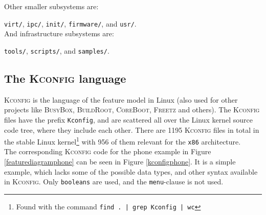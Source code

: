 \documentclass[a4paper,11pt]{report}
\newcommand{\f}{\footnote{\fn}}
\newcommand{\textcode}[1]{\fboxsep=1pt\texttt{\colorbox{gray!20}{#1}}}
\newcommand{\figa}{
    \begin{figure}[!htpb]
    \centering
}
\newcommand{\figb}[2]{
    \caption{#1}
    \label{#2}
    \end{figure}
}
\begin{document}
Other smaller subsystems are:

\texttt{virt/}, \texttt{ipc/}, \texttt{init/}, \texttt{firmware/}, and \texttt{usr/}.
\\

And infrastructure subsystems are:

\texttt{tools/}, \texttt{scripts/}, and \texttt{samples/}.

            \subsection{The \textsc{Kconfig} language} 

            \def \fn{Found with the command \textcode{find .\ | grep Kconfig | wc}}

\textsc{Kconfig} is the language of the feature model in Linux (also used for 
other projects like \textsc{BusyBox}, \textsc{BuildRoot}, \textsc{CoreBoot}, 
\textsc{Freetz} and others)\cite[p. 4]{VarModSSD}.  The \textsc{Kconfig} files have the prefix \textcode{Kconfig}, and are 
scattered all over the Linux kernel source code tree, where they include each 
other. There are 1195 \textsc{Kconfig} files in total in the stable Linux kernel\f
with 956 of them relevant for the \texttt{x86} architecture.
\\

The corresponding \textsc{Kconfig} code for the phone example in Figure 
\ref{featurediagramphone} can be seen in Figure \ref{kconfigphone}. It 
is a simple example, which lacks some of the possible data types, and other 
syntax available in \textsc{Kconfig}. Only \texttt{booleans} are used, and the \textcode{menu}-clause is not used.
\end{document}
